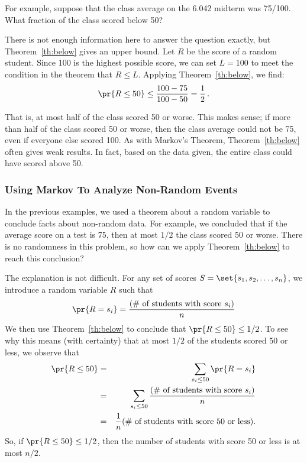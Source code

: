 \begin{editingnotes}
For example, suppose that the class average on the 6.042 midterm was
75/100.  What fraction of the class scored below 50?

There is not enough information here to answer the question exactly,
but Theorem~\ref{th:below} gives an upper bound.  Let $R$ be the score
of a random student.  Since 100 is the highest possible score, we
can set $L = 100$ to meet the condition in the theorem that $R \leq
L$.  Applying Theorem~\ref{th:below}, we find:
\begin{displaymath}
  \pr{R \leq 50} \leq \frac{100 - 75}{100 - 50} = \frac{1}{2}\,.
\end{displaymath}

That is, at most half of the class scored 50 or worse.  This makes
sense; if more than half of the class scored 50 or worse, then the
class average could not be 75, even if everyone else scored 100.
As with Markov's Theorem, Theorem~\ref{th:below} often gives weak
results.  In fact, based on the data given, the entire class could
have scored above 50.

\subsubsection*{Using Markov To Analyze Non-Random Events}

In the previous examples, we used a theorem about a random variable to
conclude facts about non-random data.  For example, we concluded that
if the average score on a test is 75, then at most $1/2$ the
class scored 50 or worse.  There is no randomness in this problem,
so how can we apply Theorem~\ref{th:below} to reach this conclusion?

The explanation is not difficult.  For any set of scores $S = \set{s_1,
s_2, \dots, s_n}$, we introduce a random variable $R$ such that
\[
\pr{R = s_i} = \frac{\text{(\# of students with score $s_i$)}}{n}
\]
We then use Theorem~\ref{th:below} to conclude that $\pr{R \leq 50}
\leq 1/2$.  To see why this means (with certainty) that at most
$1/2$ of the students scored 50 or less, we observe that
\begin{eqnarray*}
\pr{R \leq 50}  & = & \sum_{s_i \leq 50} \pr{R = s_i} \\
  & = & \sum_{s_i \leq 50} \frac{\text{(\# of students with score $s_i$)}}{n} \\
  & = & \frac{1}{n} \text{(\# of students with score 50 or less)}.
\end{eqnarray*}
So, if $\pr{R \leq 50} \leq 1/2$, then the number of students
with score 50 or less is at most $n/2$.

\end{editingnotes}

